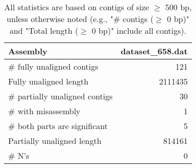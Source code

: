 \documentclass[12pt,a4paper]{article}
\begin{document}
\begin{table}[ht]
\begin{center}
\caption{All statistics are based on contigs of size $\geq$ 500 bp, unless otherwise noted (e.g., "\# contigs ($\geq$ 0 bp)" and "Total length ($\geq$ 0 bp)" include all contigs).}
\begin{tabular}{|l*{1}{|r}|}
\hline
Assembly & dataset\_658.dat \\ \hline
\# fully unaligned contigs & 121 \\ \hline
Fully unaligned length & 2111435 \\ \hline
\# partially unaligned contigs & 30 \\ \hline
\hspace{5mm}\# with misassembly & 1 \\ \hline
\hspace{5mm}\# both parts are significant & 5 \\ \hline
Partially unaligned length & 814161 \\ \hline
\# N's & 0 \\ \hline
\end{tabular}
\end{center}
\end{table}
\end{document}
